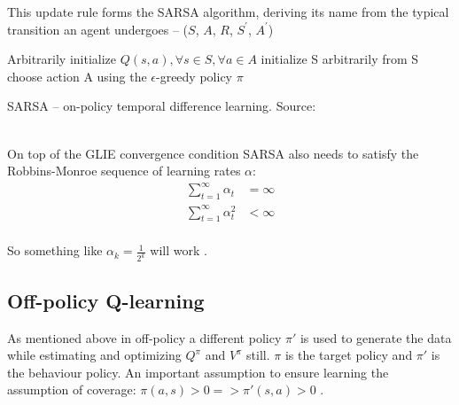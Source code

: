This update rule forms the SARSA algorithm, deriving its name
from the typical transition an agent undergoes -- 
($S$, $A$, $R$, $S^'$, $A^'$)\\

\begin{algorithm}[H]
\SetAlgoLined
Arbitrarily initialize $Q(s, a), \forall s \in S, \forall a \in A$\;
initialize S arbitrarily\;
from S choose action A using the $\epsilon$-greedy policy $\pi$\;
\caption{SARSA -- on-policy temporal difference learning. Source: \cite{lecture_mfc} }
\label{algorithm:sarsa}
\end{algorithm}\\

On top of the GLIE convergence condition SARSA also needs
to satisfy the Robbins-Monroe sequence of learning rates $\alpha$: 
\begin{align*}
    \sum^{\infty}_{t=1} \alpha_{t} &= \infty \\
    \sum^{\infty}_{t=1} \alpha_{t}^{2} & < \infty \\
\end{align*}

So something like $\alpha_{k} = \frac{1}{2^{k}}$ will 
work \cite{lecture_mfc}.


\subsection{Off-policy Q-learning}

As mentioned above in off-policy a different policy  $\pi'$ is used to generate the data while estimating and optimizing $Q^{\pi}$ and $V^{\pi}$ still. $\pi$ is the target policy and $\pi'$ is the  behaviour policy. An important assumption to ensure learning the assumption of coverage: $\pi(a, s) > 0 => \pi'(s, a) > 0$ \cite{lecture_mfc}.\\

